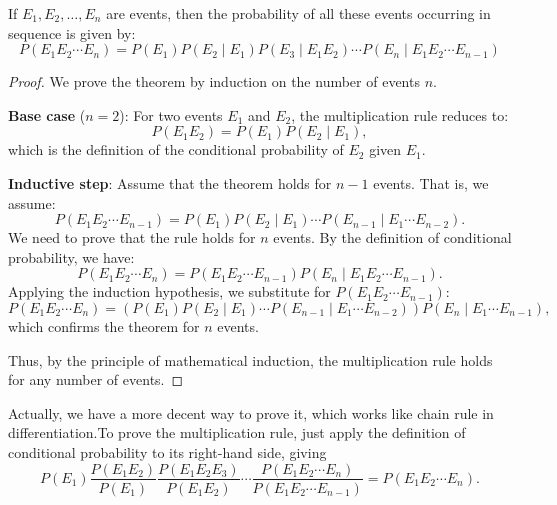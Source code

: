         \begin{theorem}
            If \(E_1, E_2, \ldots, E_n\) are events, then the probability of all these events occurring in sequence is given by:
            \[
            P(E_1 E_2 \cdots E_n) = P(E_1) P(E_2 \mid E_1) P(E_3 \mid E_1 E_2) \cdots P(E_n \mid E_1 E_2 \cdots E_{n-1})
            \]
            \end{theorem}
            
            \begin{proof}
            We prove the theorem by induction on the number of events \(n\).
            
            \textbf{Base case} (\(n = 2\)): For two events \(E_1\) and \(E_2\), the multiplication rule reduces to:
            \[
            P(E_1 E_2) = P(E_1) P(E_2 \mid E_1),
            \]
            which is the definition of the conditional probability of \(E_2\) given \(E_1\).
            
            \textbf{Inductive step}: Assume that the theorem holds for \(n-1\) events. That is, we assume:
            \[
            P(E_1 E_2 \cdots E_{n-1}) = P(E_1) P(E_2 \mid E_1) \cdots P(E_{n-1} \mid E_1 \cdots E_{n-2}).
            \]
            We need to prove that the rule holds for \(n\) events. By the definition of conditional probability, we have:
            \[
            P(E_1 E_2 \cdots E_n) = P(E_1 E_2 \cdots E_{n-1}) P(E_n \mid E_1 E_2 \cdots E_{n-1}).
            \]
            Applying the induction hypothesis, we substitute for \(P(E_1 E_2 \cdots E_{n-1})\):
            \[
            P(E_1 E_2 \cdots E_n) = \left(P(E_1) P(E_2 \mid E_1) \cdots P(E_{n-1} \mid E_1 \cdots E_{n-2})\right) P(E_n \mid E_1 \cdots E_{n-1}),
            \]
            which confirms the theorem for \(n\) events.
            
            Thus, by the principle of mathematical induction, the multiplication rule holds for any number of events.
        \end{proof}
        \begin{remark}
            Actually, we have a more decent way to prove it, which works like chain rule in differentiation.To prove the multiplication rule, just apply the definition of conditional probability
            to its right-hand side, giving
            \[P(E_1)\frac{P(E_1E_2)}{P(E_1)}\frac{P(E_1E_2E_3)}{P(E_1E_2)}\cdots\frac{P(E_1E_2\cdots E_n)}{P(E_1E_2\cdots E_{n-1})}=P(E_1E_2\cdots E_n).\]
        \end{remark}

